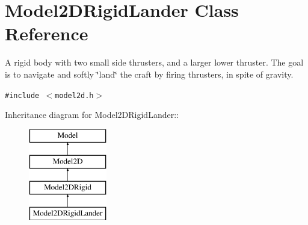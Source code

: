 \section{Model2DRigid\-Lander  Class Reference}
\label{classModel2DRigidLander}
A rigid body with two small side thrusters, and a larger lower thruster. The goal is to navigate and softly \char`\"{}land\char`\"{} the craft by firing thrusters, in spite of gravity. 


{\tt \#include $<$model2d.h$>$}

Inheritance diagram for Model2DRigid\-Lander::\begin{figure}[H]
\begin{center}
\leavevmode
\includegraphics[height=4cm]{classModel2DRigidLander}
\end{center}
\end{figure}
